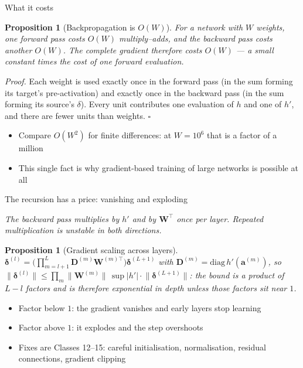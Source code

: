 \documentclass[aspectratio=169, 11pt]{beamer}
\newtheorem{propx}[theorem]{Proposition}
\newcommand{\bridge}[1]{%
  {\scriptsize\itshape\color{mcMuted} #1\par}\vspace{0.35em}}
\newcommand{\src}[3]{}      %
\begin{document}
\begin{frame}{What it costs}
  \src{bishop2024}{section}{8.1.4}
  \vspace{0.2em}
  \begin{propx}[Backpropagation is $O(W)$]
    {\small For a network with $W$ weights, one forward pass costs
    $O(W)$ multiply--adds, and the backward pass costs another $O(W)$.
    The complete gradient therefore costs $O(W)$ --- a small constant
    times the cost of one forward evaluation.}
  \end{propx}
  \vspace{0.2em}
  {\footnotesize
  \emph{Proof.} Each weight is used exactly once in the forward pass
  (in the sum forming its target's pre-activation) and exactly once in
  the backward pass (in the sum forming its source's $\delta$). Every
  unit contributes one evaluation of $h$ and one of $h'$, and there are
  fewer units than weights. \hfill$\square$}
  \vspace{0.4em}
  {\small
  \begin{itemize}\setlength{\itemsep}{3pt}
    \item Compare $O(W^{2})$ for finite differences: at $W=10^{6}$ that
          is a factor of a million
    \item This single fact is why gradient-based training of large
          networks is possible at all
  \end{itemize}}
\end{frame}

\begin{frame}{The recursion has a price: vanishing and exploding}
  \src{bishop2024}{equation}{7.51}
  \src{bishop2024}{section}{7.4.2}
  \src{prince2023}{section}{7.5}
  \bridge{The backward pass multiplies by $h'$ and by $\mathbf{W}^\top$
  once per layer. Repeated multiplication is unstable in both
  directions.}
  \vspace{0.2em}
  \begin{propx}[Gradient scaling across layers]
    {\small
    $\bm\delta^{(l)} = \big(\textstyle\prod_{m=l+1}^{L}
    \mathbf{D}^{(m)}\mathbf{W}^{(m)\top}\big)\bm\delta^{(L+1)}$ with
    $\mathbf{D}^{(m)}=\mathrm{diag}\,h'(\mathbf{a}^{(m)})$, so
    $\lVert\bm\delta^{(l)}\rVert
    \leq \prod_m \lVert\mathbf{W}^{(m)}\rVert\,
    \sup|h'| \cdot \lVert\bm\delta^{(L+1)}\rVert$: the bound is a
    \alert{product of $L-l$ factors} and is therefore exponential in
    depth unless those factors sit near $1$.}
  \end{propx}
  \vspace{0.4em}
  {\small
  \begin{itemize}\setlength{\itemsep}{3pt}
    \item Factor below $1$: the gradient \alert{vanishes} and early
          layers stop learning
    \item Factor above $1$: it \alert{explodes} and the step overshoots
    \item Fixes are Classes 12--15: careful initialisation,
          normalisation, residual connections, gradient clipping
  \end{itemize}}
\end{frame}
\end{document}

